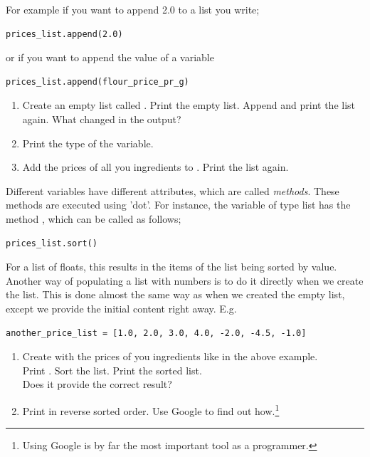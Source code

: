 \documentclass{article}
\begin{document}
For example if you want to append 2.0 to a list you write;

\begin{lstlisting}
prices_list.append(2.0)
\end{lstlisting}

or if you want to append the value of a variable

\begin{lstlisting}
prices_list.append(flour_price_pr_g)
\end{lstlisting}

\begin{enumerate}[resume]
    \item Create an empty list called .
    Print the empty list.
    Append  and print the list again.
    What changed in the output?

    \item Print the type of the variable.

    \item Add the prices of all you ingredients to . Print the list again.

 \end{enumerate}


Different variables have different attributes, which are called {\em methods}.
These methods are executed using 'dot'.
For instance, the variable of type list has the method , which can be called as follows;

\begin{lstlisting}
prices_list.sort()
\end{lstlisting}

For a list of floats, this results in the items of the list being sorted by value.\\

Another way of populating a list with numbers is to do it directly when we create the list.
This is done almost the same way as when we created the empty list, except we
provide the initial content right away. E.g.

\begin{lstlisting}
another_price_list = [1.0, 2.0, 3.0, 4.0, -2.0, -4.5, -1.0]
\end{lstlisting}

\begin{enumerate}[resume]
    \item Create  with the prices of you ingredients like in the above example.\\
    Print . Sort the list. Print the sorted list. \\
    Does it provide the correct result?

    \item Print  in reverse sorted order.
    Use Google to find out how.\footnote{Using Google is
    by far the most important tool as a programmer.}
\end{enumerate}
\end{document}
